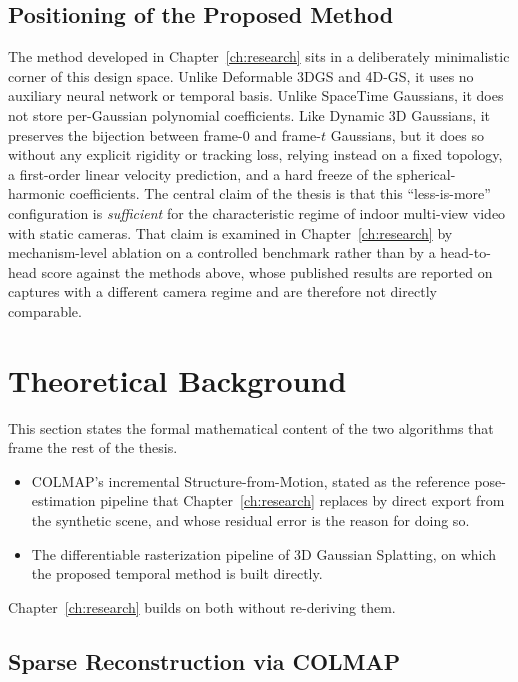 \subsection{Positioning of the Proposed Method}

The method developed in Chapter~\ref{ch:research} sits in a deliberately
minimalistic corner of this design space. Unlike Deformable 3DGS and 4D-GS, it
uses no auxiliary neural network or temporal basis. Unlike SpaceTime Gaussians,
it does not store per-Gaussian polynomial coefficients. Like
Dynamic 3D Gaussians, it preserves the bijection between frame-0 and frame-$t$
Gaussians, but it does so without any explicit rigidity or tracking loss,
relying instead on a fixed topology, a first-order linear velocity prediction,
and a hard freeze of the spherical-harmonic coefficients. The central claim of
the thesis is that this \enquote{less-is-more} configuration is
\emph{sufficient} for the characteristic regime of indoor multi-view video with
static cameras. That claim is examined in Chapter~\ref{ch:research} by
mechanism-level ablation on a controlled benchmark rather than by a head-to-head
score against the methods above, whose published results are reported on
captures with a different camera regime and are therefore not directly
comparable.

\section{Theoretical Background}

This section states the formal mathematical content of the two algorithms that
frame the rest of the thesis.
\begin{itemize}
    \item COLMAP's incremental Structure-from-Motion, stated as the reference
    pose-estimation pipeline that Chapter~\ref{ch:research} replaces by direct
    export from the synthetic scene, and whose residual error is the reason for
    doing so.

    \item The differentiable rasterization pipeline of 3D Gaussian Splatting, on
    which the proposed temporal method is built directly.
\end{itemize}
Chapter~\ref{ch:research} builds on both without re-deriving them.

\subsection{Sparse Reconstruction via COLMAP}

